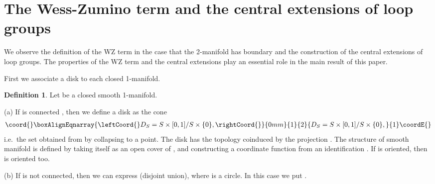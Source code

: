 \documentclass[a4paper,a4paper]{article}
\theoremstyle{definition}
\newtheorem{dfn}[thm]{Definition}
\theoremstyle{remark}
\begin{document}

\section{The Wess-Zumino term and the central extensions of loop groups}
\label{la_WZ_ce}

We observe the definition of the WZ term in the case that the 2-manifold has boundary and the construction of the central extensions of loop groups. The properties of the WZ term and the central extensions play an essential role in the main result of this paper.

\smallskip

First we associate a disk to each closed 1-manifold.

\begin{dfn}
Let \coordHE{} be a closed smooth 1-manifold.

(a) If \coordHE{} is connected \coordHE{}, then we define a disk \coordHE{} as the cone 
\begin{eqnarray*}\coord{}\boxAlignEqnarray{\leftCoord{}
D_S = S \times [0,1] / S \times \{0\} , 
\rightCoord{}}{0mm}{1}{2}{
D_S = S \times [0,1] / S \times \{0\} , 
}{1}\coordE{}\end{eqnarray*}
i.e.\ the set obtained from \coordHE{} by collapsing \coordHE{} to a point. The disk \coordHE{} has the topology coinduced by the projection \coordHE{}. The structure of smooth manifold is defined by taking \coordHE{} itself as an open cover of \coordHE{}, and constructing a coordinate function \coordHE{} from an identification \coordHE{}. If \coordHE{} is oriented, then \coordHE{} is oriented too.

(b) If \coordHE{} is not connected, then we can express \coordHE{} (disjoint union), where \coordHE{} is a circle. In this case we put \coordHE{}.
\end{dfn}
\end{document}
